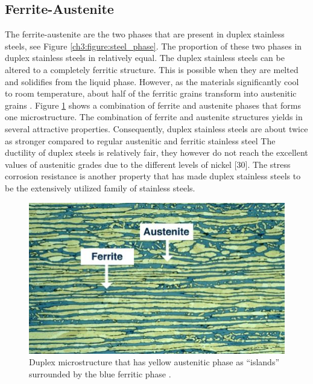 \documentclass[12pt]{report}
\begin{document}
\subsection{Ferrite-Austenite}
The ferrite-austenite are the two phases that are present in duplex stainless steels, see Figure \ref{ch3:figure:steel_phase}. The proportion of these two phases in duplex stainless steels in relatively equal. The duplex stainless steels can be altered to a completely ferritic structure. This is possible when they are melted and solidifies from the liquid phase\cite{xiao2006challenge}.  However, as the materials significantly cool to room temperature, about half of the ferritic grains transform into austenitic grains \cite{steels3practical}. Figure \ref{ch3:figure:duplex_microstructure} shows a combination of ferrite and austenite phases that forms one microstructure.
The combination of ferrite and austenite structures yields in several attractive properties. Consequently, duplex stainless steels are about twice as stronger compared to regular austenitic and ferritic stainless steel \cite{steels3practical} The ductility of duplex steels is relatively fair, they however do not reach the excellent values of austenitic grades due to the different levels of nickel [30]. The stress corrosion resistance is another property that has made duplex stainless steels to be the extensively utilized family of stainless steels. 

\begin{figure}[H]
    \centering
    \includegraphics[width=.6\textwidth]{duplex_microstructure_that_has_yellow_austenitic_phase.jpg}
    \caption{Duplex microstructure that has yellow austenitic phase as “islands” surrounded by the blue ferritic phase \cite{steels3practical}.}
    \label{ch3:figure:duplex_microstructure}
\end{figure}
\end{document}
